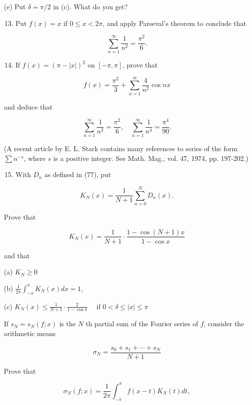 \documentclass[10pt]{article}
\begin{document}
(e) Put $\delta=\pi / 2$ in (c). What do you get?

\begin{enumerate}
  \setcounter{enumi}{12}
  \item Put $f(x)=x$ if $0 \leq x<2 \pi$, and apply Parseval's theorem to conclude that
\end{enumerate}

$$
\sum_{n=1}^{\infty} \frac{1}{n^{2}}=\frac{\pi^{2}}{6} .
$$

\begin{enumerate}
  \setcounter{enumi}{13}
  \item If $f(x)=(\pi-|x|)^{2}$ on $[-\pi, \pi]$, prove that
\end{enumerate}

$$
f(x)=\frac{\pi^{2}}{3}+\sum_{n=1}^{\infty} \frac{4}{n^{2}} \cos n x
$$

and deduce that

$$
\sum_{n=1}^{\infty} \frac{1}{n^{2}}=\frac{\pi^{2}}{6}, \quad \sum_{n=1}^{\infty} \frac{1}{n^{4}}=\frac{\pi^{4}}{90} .
$$

(A recent article by E. L. Stark contains many references to series of the form $\sum n^{-s}$, where $s$ is a positive integer. See Math. Mag., vol. 47, 1974, pp. 197-202.)

\begin{enumerate}
  \setcounter{enumi}{14}
  \item With $D_{n}$ as defined in (77), put
\end{enumerate}

$$
K_{N}(x)=\frac{1}{N+1} \sum_{n=0}^{N} D_{n}(x) .
$$

Prove that

$$
K_{N}(x)=\frac{1}{N+1} \cdot \frac{1-\cos (N+1) x}{1-\cos x}
$$

and that

(a) $K_{N} \geq 0$

(b) $\frac{1}{2 \pi} \int_{-\pi}^{\pi} K_{N}(x) d x=1$,

(c) $K_{N}(x) \leq \frac{1}{N+1} \cdot \frac{2}{1-\cos \delta} \quad$ if $0<\delta \leq|x| \leq \pi$

If $s_{N}=s_{N}(f ; x)$ is the $N$ th partial sum of the Fourier series of $f$, consider the arithmetic means

$$
\sigma_{N}=\frac{s_{0}+s_{1}+\cdots+s_{N}}{N+1}
$$

Prove that

$$
\sigma_{N}(f ; x)=\frac{1}{2 \pi} \int_{-\pi}^{\pi} f(x-t) K_{N}(t) d t,
$$
\end{document}
